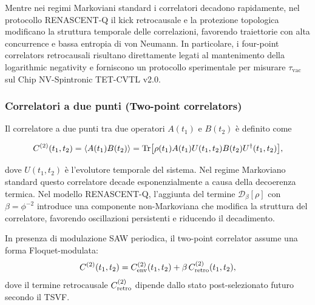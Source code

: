\documentclass[11pt,a4paper]{article}
\theoremstyle{plain}
\theoremstyle{definition}
\begin{document}
\vspace{0.3cm}

Mentre nei regimi Markoviani standard i correlatori decadono rapidamente, nel protocollo RENASCENT-Q il kick retrocausale e la protezione topologica modificano la struttura temporale delle correlazioni, favorendo traiettorie con alta concurrence e bassa entropia di von Neumann. In particolare, i four-point correlators retrocausali risultano direttamente legati al mantenimento della logarithmic negativity e forniscono un protocollo sperimentale per misurare $\tau_{\text{vac}}$ sul Chip NV-Spintronic TET-CVTL v2.0.


\vspace{0.3cm}

\subsubsection{Correlatori a due punti (Two-point correlators)}

\vspace{0.2cm}

Il correlatore a due punti tra due operatori $A(t_1)$ e $B(t_2)$ è definito come


\vspace{0.2cm}
\begin{equation}
C^{(2)}(t_1,t_2) = \langle A(t_1) B(t_2) \rangle = \Tr \bigl[ \rho(t_1) A(t_1) U(t_1,t_2) B(t_2) U^\dagger(t_1,t_2) \bigr],
\label{eq:two_point}
\end{equation}


\vspace{0.3cm}
dove $U(t_1,t_2)$ è l’evolutore temporale del sistema. Nel regime Markoviano standard questo correlatore decade esponenzialmente a causa della decoerenza termica. Nel modello RENASCENT-Q, l’aggiunta del termine $\mathcal{D}_\beta[\rho]$ con $\beta = \phi^{-2}$ introduce una componente non-Markoviana che modifica la struttura del correlatore, favorendo oscillazioni persistenti e riducendo il decadimento.


\vspace{0.3cm}

In presenza di modulazione SAW periodica, il two-point correlator assume una forma Floquet-modulata:
\begin{equation}
C^{(2)}(t_1,t_2) = C^{(2)}_{\rm env}(t_1,t_2) + \beta \, C^{(2)}_{\rm retro}(t_1,t_2),
\label{eq:two_point_retro}
\end{equation}
dove il termine retrocausale $C^{(2)}_{\rm retro}$ dipende dallo stato post-selezionato futuro secondo il TSVF.
\end{document}
